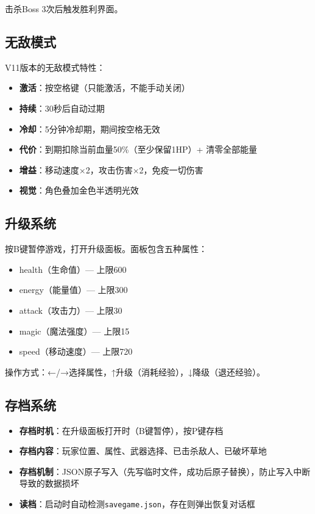 \documentclass[12pt,a4paper]{ctexart}
\begin{document}
击杀Boss 3次后触发胜利界面。

\subsection{无敌模式}

V11版本的无敌模式特性：

\begin{itemize}
    \item \textbf{激活}：按空格键（只能激活，不能手动关闭）
    \item \textbf{持续}：30秒后自动过期
    \item \textbf{冷却}：5分钟冷却期，期间按空格无效
    \item \textbf{代价}：到期扣除当前血量50\%（至少保留1HP）+ 清零全部能量
    \item \textbf{增益}：移动速度×2，攻击伤害×2，免疫一切伤害
    \item \textbf{视觉}：角色叠加金色半透明光效
\end{itemize}

\subsection{升级系统}

按B键暂停游戏，打开升级面板。面板包含五种属性：

\begin{itemize}
    \item health（生命值）— 上限600
    \item energy（能量值）— 上限300
    \item attack（攻击力）— 上限30
    \item magic（魔法强度）— 上限15
    \item speed（移动速度）— 上限720
\end{itemize}

操作方式：←/→选择属性，↑升级（消耗经验），↓降级（退还经验）。

\subsection{存档系统}

\begin{itemize}
    \item \textbf{存档时机}：在升级面板打开时（B键暂停），按P键存档
    \item \textbf{存档内容}：玩家位置、属性、武器选择、已击杀敌人、已破坏草地
    \item \textbf{存档机制}：JSON原子写入（先写临时文件，成功后原子替换），防止写入中断导致的数据损坏
    \item \textbf{读档}：启动时自动检测\texttt{savegame.json}，存在则弹出恢复对话框
\end{itemize}
\end{document}
